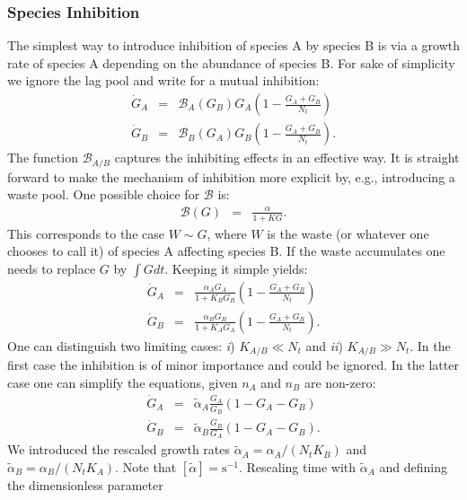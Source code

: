 \documentclass[10pt,A4paper]{article}
\begin{document}
\subsubsection{Species Inhibition}
The simplest way to introduce inhibition of species A by species B is via a growth rate of species A depending on the abundance of species B. 
For sake of simplicity we ignore the lag pool and write for a mutual inhibition:
\begin{eqnarray}
    \dot{G}_A &=& \mathcal{B}_A(G_B)G_A\left(1 - \frac{G_A+G_B}{N_t}\right)\\
    \dot{G}_B &=& \mathcal{B}_B(G_A) G_B\left(1-\frac{G_A+G_B}{N_t}\right). 
\end{eqnarray}
The function $\mathcal{B}_{A/B}$ captures the inhibiting effects in an effective way. 
It is straight forward to make the mechanism of inhibition more explicit by, e.g., introducing a waste pool. 
One possible choice for $\mathcal{B}$ is: 
\begin{eqnarray}
    \mathcal{B}(G)&=&\frac{\alpha}{1+KG}. 
\end{eqnarray}
This corresponds to the case $W\sim G$, where $W$ is the waste (or whatever one chooses to call it) of species A affecting species B. 
If the waste accumulates one needs to replace $G$ by $\int G dt$. Keeping it simple yields:
\begin{eqnarray}
    \dot{G}_A &=& \frac{\alpha_A G_A}{1+K_BG_B}\left(1 - \frac{G_A+G_B}{N_t}\right)\\
    \dot{G}_B &=& \frac{\alpha_B G_B}{1+K_AG_A}\left(1-\frac{G_A+G_B}{N_t}\right). 
\end{eqnarray}
One can distinguish two limiting cases: {\it i}) $K_{A/B}\ll N_t$ and {\it ii}) $K_{A/B}\gg N_t$. 
In the first case the inhibition is of minor importance and could be ignored. 
In the latter case one can simplify the equations, given $n_A$ and $n_B$ are non-zero:
\begin{eqnarray}
\label{Mut_Inhib}
    \dot{G}_A &=&\tilde{\alpha}_A\frac{G_A}{G_B}\left(1 - G_A-G_B\right)\\
    \dot{G}_B &=& \tilde{\alpha}_B\frac{G_B}{G_A}\left(1-G_A-G_B\right). 
\end{eqnarray}
We introduced the rescaled growth rates $\tilde{\alpha}_A=\alpha_A/(N_tK_B)$ and $\tilde{\alpha}_B=\alpha_B/(N_tK_A)$. Note that $[\tilde{\alpha}]=\mathrm{s}^{-1}$.
Rescaling time with $\tilde{\alpha}_A$ and defining the dimensionless parameter 
\end{document}
